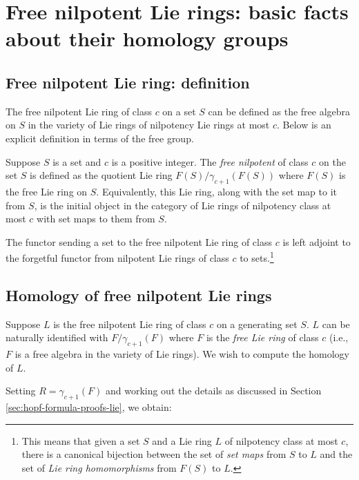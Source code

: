 \documentclass{ucetd}
\begin{document}
\section{Free nilpotent Lie rings: basic facts about their homology groups}\label{sec:free-nilpotent-lie-homology}

\subsection{Free nilpotent Lie ring: definition}

The free nilpotent Lie ring of class $c$ on a set $S$ can be defined
as the free algebra on $S$ in the variety of Lie rings of nilpotency
Lie rings at most $c$. Below is an explicit definition in terms of the
free group.

\begin{definer}
  Suppose $S$ is a set and $c$ is a positive integer. The {\em free
    nilpotent } of class $c$ on the set $S$ is defined as the
  quotient Lie ring $F(S)/\gamma_{c+1}(F(S))$ where $F(S)$ is the free
  Lie ring on $S$. Equivalently, this Lie ring, along with the set map to it
  from $S$, is the initial object in the category of Lie rings of
  nilpotency class at most $c$ with set maps to them from $S$.

  The functor sending a set to the free nilpotent Lie ring of class $c$
  is left adjoint to the forgetful functor from nilpotent Lie rings of
  class $c$ to sets.\footnote{This means that given a set $S$ and a
    Lie ring $L$ of nilpotency class at most $c$, there is a canonical
    bijection between the set of {\em set maps} from $S$ to $L$ and
    the set of {\em Lie ring homomorphisms} from $F(S)$ to $L$.}
\end{definer}

\subsection{Homology of free nilpotent Lie rings}

Suppose $L$ is the free nilpotent Lie ring of class $c$ on a generating
set $S$. $L$ can be naturally identified with $F/\gamma_{c+1}(F)$
where $F$ is the {\em free Lie ring} of class $c$ (i.e., $F$ is a free
algebra in the variety of Lie rings). We wish to compute the homology of
$L$.

Setting $R = \gamma_{c+1}(F)$ and working out the details as discussed
in Section \ref{sec:hopf-formula-proofs-lie}, we obtain:
\end{document}
